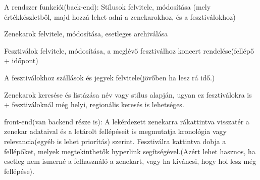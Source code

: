 A rendszer funkciói(back-end):
Stílusok felvitele, módosítása (mely értékkészletből, majd hozzá lehet adni a zenekarokhoz, és a fesztiválokhoz)

Zenekarok felvitele, módosítása, esetleges archiválása

Fesztiválok felvitele, módosítása, a meglévő fesztiválhoz koncert rendelése(fellépő + időpont)

A fesztiválokhoz szállások és jegyek felvitele(jövőben ha lesz rá idő.)

Zenekarok keresése és listázása név vagy stílus alapján, ugyan ez fesztiválokra is + fesztiváloknál még helyi, regionális keresés is lehetséges.

front-end(van backend része is):
A lekérdezett zenekarra rákattintva visszatér a zenekar adataival és a letárolt fellépéseit is megmutatja kronológia vagy relevancia(egyéb is lehet priorítás) szerint.
Fesztiválra kattintva dobja a fellépőket, melyek megtekinthetők hyperlink segítségével.(Azért lehet hasznos, ha esetleg nem ismerné a felhasználó a zenekart, vagy ha kíváncsi, hogy hol lesz még fellépése).